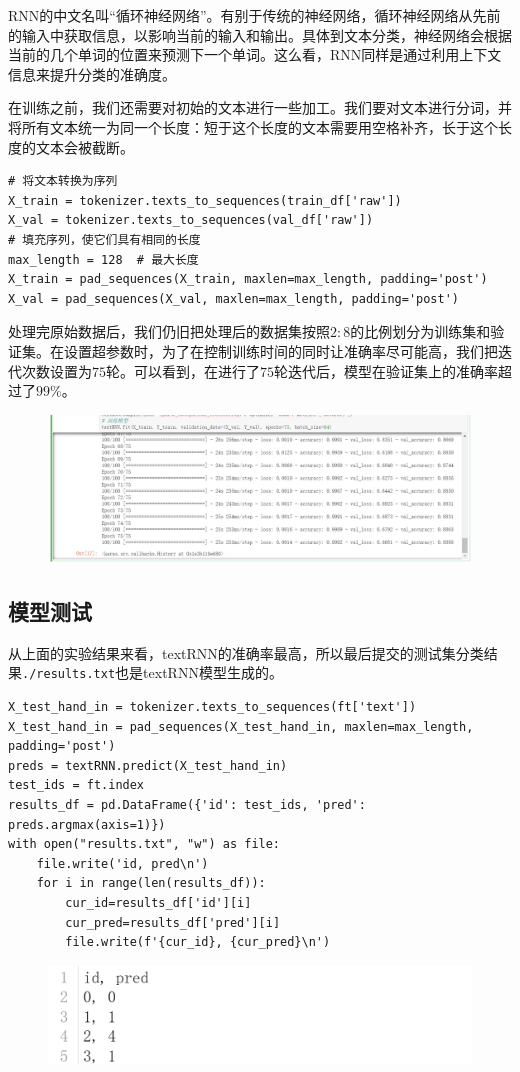 \documentclass{article}
\begin{document}
RNN的中文名叫“循环神经网络”。有别于传统的神经网络，循环神经网络从先前的输入中获取信息，以影响当前的输入和输出。具体到文本分类，神经网络会根据当前的几个单词的位置来预测下一个单词。这么看，RNN同样是通过利用上下文信息来提升分类的准确度。

在训练之前，我们还需要对初始的文本进行一些加工。我们要对文本进行分词，并将所有文本统一为同一个长度：短于这个长度的文本需要用空格补齐，长于这个长度的文本会被截断。
\begin{lstlisting}
# 将文本转换为序列
X_train = tokenizer.texts_to_sequences(train_df['raw'])
X_val = tokenizer.texts_to_sequences(val_df['raw'])
# 填充序列，使它们具有相同的长度
max_length = 128  # 最大长度
X_train = pad_sequences(X_train, maxlen=max_length, padding='post')
X_val = pad_sequences(X_val, maxlen=max_length, padding='post')
\end{lstlisting}
处理完原始数据后，我们仍旧把处理后的数据集按照$2:8$的比例划分为训练集和验证集。在设置超参数时，为了在控制训练时间的同时让准确率尽可能高，我们把迭代次数设置为$75$轮。可以看到，在进行了$75$轮迭代后，模型在验证集上的准确率超过了$99\%$。
\begin{figure}[h]
    \centering
    \includegraphics[width=\linewidth]{image12.png}
    \label{fig:enter-label}
\end{figure}

\subsection{模型测试}
从上面的实验结果来看，textRNN的准确率最高，所以最后提交的测试集分类结果\lstinline|./results.txt|也是textRNN模型生成的。
\begin{lstlisting}
X_test_hand_in = tokenizer.texts_to_sequences(ft['text'])
X_test_hand_in = pad_sequences(X_test_hand_in, maxlen=max_length, padding='post')
preds = textRNN.predict(X_test_hand_in)
test_ids = ft.index
results_df = pd.DataFrame({'id': test_ids, 'pred': preds.argmax(axis=1)})
with open("results.txt", "w") as file:
    file.write('id, pred\n')
    for i in range(len(results_df)):
        cur_id=results_df['id'][i]
        cur_pred=results_df['pred'][i]
        file.write(f'{cur_id}, {cur_pred}\n')
\end{lstlisting}
\begin{figure}[h]
    \centering
    \includegraphics[width=1\linewidth]{image13.png}
    \label{fig:enter-label}
\end{figure}
\end{document}

